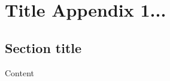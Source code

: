 \documentclass[../main/thesis.tex]{subfiles}
\begin{document}
\chapter{Title Appendix 1...}

\section{Section title}
Content

\bib
\end{document}
